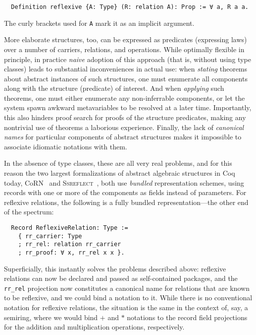 \documentclass[a4paper,10pt,runningheads]{llncs}
\begin{document}
\begin{lstlisting}
  Definition reflexive {A: Type} (R: relation A): Prop := ∀ a, R a a.
\end{lstlisting}
The curly brackets used for \lstinline|A| mark it as an implicit argument.

More elaborate structures, too, can be expressed as predicates (expressing laws) over a number of carriers, relations, and operations. While optimally flexible in principle, in practice \emph{naive} adoption of this approach (that is, without using type classes) leads to substantial inconveniences in actual use: when \emph{stating} theorems about abstract instances of such structures, one must enumerate all components along with the structure (predicate) of interest. And when \emph{applying} such theorems, one must either enumerate any non-inferrable components, or let the system spawn awkward metavariables to be resolved at a later time. Importantly, this also hinders proof search for proofs of the structure predicates, making any nontrivial use of theorems a laborious experience. Finally, the lack of \emph{canonical names} for particular components of abstract structures makes it impossible to associate idiomatic notations with them.


In the absence of type classes, these are all very real problems, and for this reason the two largest formalizations of abstract algebraic structures in Coq today, CoRN~\cite{C-corn} and \textsc{Ssreflect}~\cite{Packed}, both use \emph{bundled} representation schemes, using records with one or more of the components as fields instead of parameters. For reflexive relations, the following is a fully bundled representation---the other end of the spectrum:
\newpage
\begin{lstlisting}
  Record ReflexiveRelation: Type :=
    { rr_carrier: Type
    ; rr_rel: relation rr_carrier
    ; rr_proof: ∀ x, rr_rel x x }.
\end{lstlisting}
Superficially, this instantly solves the problems described above: reflexive relations can now be declared and passed as self-contained packages, and the \lstinline|rr_rel| projection now constitutes a canonical name for relations that are known to be reflexive, and we could bind a notation to it. While there is no conventional notation for reflexive relations, the situation is the same in the context of, say, a semiring, where we would bind $+$ and $*$ notations to the record field projections for the addition and multiplication operations, respectively.
\end{document}
